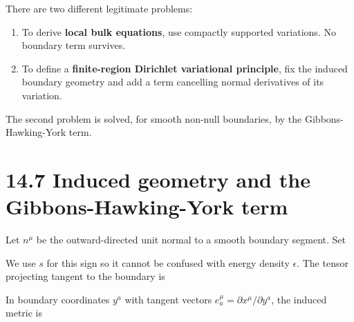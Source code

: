\documentclass[
  11pt,
  letterpaper,
  oneside,
  openany]{scrbook}
\providecommand{\tightlist}{%
  \setlength{\itemsep}{0pt}\setlength{\parskip}{0pt}}
\begin{document}
There are two different legitimate problems:

\begin{enumerate}
\def\labelenumi{\arabic{enumi}.}
\tightlist
\item
  To derive \textbf{local bulk equations}, use compactly supported
  variations. No boundary term survives.
\item
  To define a \textbf{finite-region Dirichlet variational principle},
  fix the induced boundary geometry and add a term cancelling normal
  derivatives of its variation.
\end{enumerate}

The second problem is solved, for smooth non-null boundaries, by the
Gibbons-Hawking-York term.

\hypertarget{induced-geometry-and-the-gibbons-hawking-york-term}{%
\section{14.7 Induced geometry and the Gibbons-Hawking-York
term}\label{induced-geometry-and-the-gibbons-hawking-york-term}}

Let \(n^\mu\) be the outward-directed unit normal to a smooth boundary
segment. Set

\begin{center}
\begingroup
{}
\ifdim\wd\grmathbox>\linewidth
\resizebox{\linewidth}{!}{\usebox{\grmathbox}}
\else\usebox{\grmathbox}\fi
\endgroup
\end{center}

We use \(s\) for this sign so it cannot be confused with energy density
\(\epsilon\). The tensor projecting tangent to the boundary is

\begin{center}
\begingroup
{}
\ifdim\wd\grmathbox>\linewidth
\resizebox{\linewidth}{!}{\usebox{\grmathbox}}
\else\usebox{\grmathbox}\fi
\endgroup
\end{center}

In boundary coordinates \(y^a\) with tangent vectors
\(e_a^\mu=\partial x^\mu/\partial y^a\), the induced metric is
\end{document}
